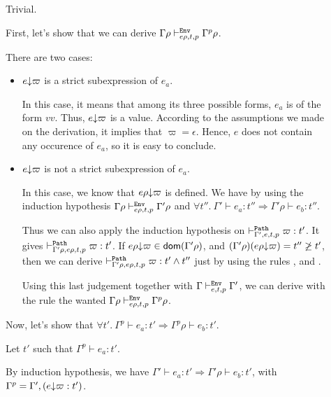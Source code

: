 \documentclass[a4paper]{article}
\theoremstyle{definition}
\begin{document}
\begin{description}
          \item[] Trivial.
          \item[] First, let's show that we can derive $\Gamma\rho \evdash p {e\rho} {t} {\Gamma^p}\rho$.
          
          There are two cases:
          \begin{itemize}
            \item $\occ e \varpi$ is a strict subexpression of $e_a$.
            
            In this case, it means that among its three possible forms,
            $e_a$ is of the form $v v$. Thus, $\occ e \varpi$ is a value.
            According to the assumptions we made on the derivation, it implies that $\varpi=\epsilon$.
            Hence, $e$ does not contain any occurence of $e_a$, so it is easy to conclude.

            \item $\occ e \varpi$ is not a strict subexpression of $e_a$.
            
            In this case, we know that $\occ {e\rho} \varpi$ is defined.
            We have by using the induction hypothesis $\Gamma\rho \evdash p {e\rho} t \Gamma'\rho$
            and $\forall t''.\ \Gamma' \vdash e_a : t'' \Rightarrow \Gamma'\rho \vdash e_b:t''$.

            Thus we can also apply the induction hypothesis on $\pvdash {\Gamma'} p {e} t \varpi:t'$.
            It gives $\pvdash {\Gamma'\rho} p {e\rho} t \varpi:t'$.
            If $\occ {e\rho}\varpi \in\dom{\Gamma'\rho}$, and $(\Gamma'\rho)(\occ {e\rho}\varpi)=t''\not\geq t'$,
            then we can derive $\pvdash {\Gamma'\rho} p {e\rho} t \varpi:t'\land t''$ just by using the rules
            ,  and .

            Using this last judgement together with $\Gamma \evdash p e t \Gamma'$, we can derive with the rule 
            the wanted $\Gamma\rho \evdash p {e\rho} {t} {\Gamma^p}\rho$.
          \end{itemize}

          Now, let's show that $\forall t'.\ \Gamma^p \vdash e_a : t' \Rightarrow \Gamma^p\rho \vdash e_b:t'$.

          Let $t'$ such that $\Gamma^p\vdash e_a:t'$.

          By induction hypothesis, we have $\Gamma' \vdash e_a : t' \Rightarrow \Gamma'\rho \vdash e_b:t'$,
          with $\Gamma^p = \Gamma',(\occ e \varpi: t')$.


\end{description}
\end{document}
